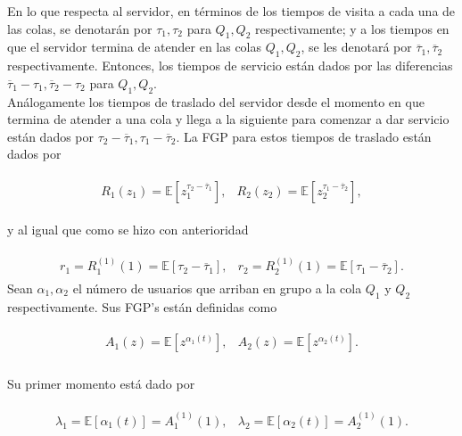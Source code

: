 \documentclass{article}
\newcommand{\esp}{\mathbb{E}}
\numberwithin{equation}{section}
\begin{document}
En lo que respecta al servidor, en t\'erminos de los tiempos de visita a cada una de las colas, se denotar\'an por $\tau_{1},\tau_{2}$ para $Q_{1},Q_{2}$ respectivamente; y a los tiempos en que el servidor termina de atender en las colas $Q_{1},Q_{2}$, se les denotar\'a por $\overline{\tau}_{1},\overline{\tau}_{2}$ respectivamente. Entonces, los tiempos de servicio est\'an dados por las diferencias $\overline{\tau}_{1}-\tau_{1},\overline{\tau}_{2}-\tau_{2}$ para $Q_{1},Q_{2}$. \\

An\'alogamente los tiempos de traslado del servidor desde el momento en que termina de atender a una cola y llega a la siguiente para comenzar a dar servicio est\'an dados por $\tau_{2}-\overline{\tau}_{1},\tau_{1}-\overline{\tau}_{2}$. La FGP para estos tiempos de traslado est\'an dados por

\begin{eqnarray}
\begin{array}{cc}
R_{1}\left(z_{1}\right)=\esp\left[z_{1}^{\tau_{2}-\overline{\tau}_{1}}\right],
&
R_{2}\left(z_{2}\right)=\esp\left[z_{2}^{\tau_{1}-\overline{\tau}_{2}}\right],
\end{array}
\end{eqnarray}

y al igual que como se hizo con anterioridad

\begin{eqnarray}
\begin{array}{cc}
r_{1}=R_{1}^{(1)}\left(1\right)=\esp\left[\tau_{2}-\overline{\tau}_{1}\right],
&
r_{2}=R_{2}^{(1)}\left(1\right)=\esp\left[\tau_{1}-\overline{\tau}_{2}\right].
\end{array}
\end{eqnarray}
Sean $\alpha_{1},\alpha_{2}$ el n\'umero de usuarios que arriban
en grupo a la cola $Q_{1}$ y $Q_{2}$ respectivamente. Sus FGP's
est\'an definidas como

\begin{eqnarray}
\begin{array}{cc}
A_{1}\left(z\right)=\esp\left[z^{\alpha_{1}\left(t\right)}\right],&
A_{2}\left(z\right)=\esp\left[z^{\alpha_{2}\left(t\right)}\right].\\
\end{array}
\end{eqnarray}

Su primer momento est\'a dado por

\begin{eqnarray}
\begin{array}{cc}
\lambda_{1}=\esp\left[\alpha_{1}\left(t\right)\right]=A_{1}^{(1)}\left(1\right),&
\lambda_{2}=\esp\left[\alpha_{2}\left(t\right)\right]=A_{2}^{(1)}\left(1\right).\\
\end{array}
\end{eqnarray}
\end{document}
